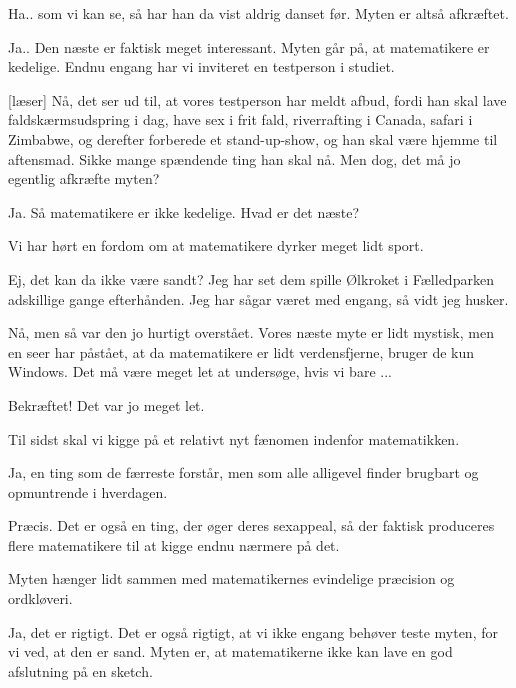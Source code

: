 \documentclass[a4paper,11pt]{article}
\begin{document}
\begin{sketch}

 Ha.. som vi kan se, så har han da vist aldrig danset før. Myten er altså afkræftet.

 Ja.. Den næste er faktisk meget interessant. Myten går på, at matematikere er kedelige. Endnu engang har vi inviteret en testperson i studiet.


[læser] Nå, det ser ud til, at vores testperson har meldt afbud, fordi han skal lave faldskærmsudspring i dag, have sex i frit fald, riverrafting i Canada, safari i Zimbabwe, og derefter forberede et stand-up-show, og han skal være hjemme til aftensmad. Sikke mange spændende ting han skal nå. Men dog, det må jo egentlig afkræfte myten?

 Ja. Så matematikere er ikke kedelige. Hvad er det næste?

 Vi har hørt en fordom om at matematikere dyrker meget lidt sport.

 Ej, det kan da ikke være sandt? Jeg har set dem spille Ølkroket i Fælledparken adskillige gange efterhånden. Jeg har sågar været med engang, så vidt jeg husker.

 Nå, men så var den jo hurtigt overstået. Vores næste myte er lidt mystisk, men en seer har påstået, at da matematikere er lidt verdensfjerne, bruger de kun Windows. Det må være meget let at undersøge, hvis vi bare ...


 Bekræftet! Det var jo meget let.

 Til sidst skal vi kigge på et relativt nyt fænomen indenfor matematikken.

 Ja, en ting som de færreste forstår, men som alle alligevel finder brugbart og opmuntrende i hverdagen.

 Præcis. Det er også en ting, der øger deres sexappeal, så der faktisk produceres flere matematikere til at kigge endnu nærmere på det.

 Myten hænger lidt sammen med matematikernes evindelige præcision og ordkløveri.

 Ja, det er rigtigt. Det er også rigtigt, at vi ikke engang behøver teste myten, for vi ved, at den er sand. Myten er, at matematikerne ikke kan lave en god afslutning på en sketch.

\end{sketch}
\end{document}

